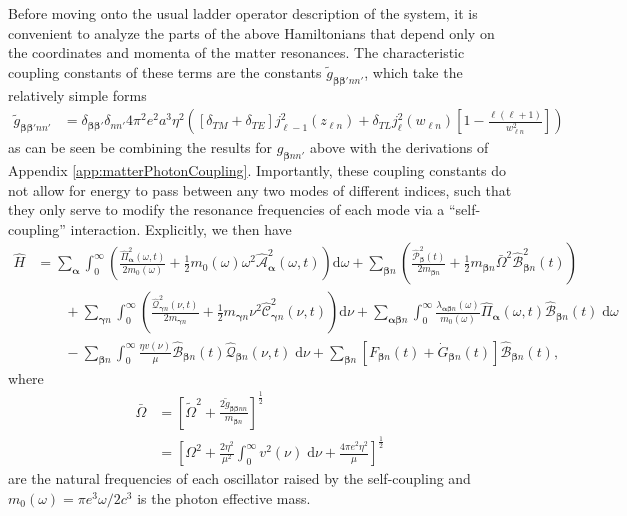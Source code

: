 \documentclass{article}
\begin{document}
Before moving onto the usual ladder operator description of the system, it is convenient to analyze the parts of the above Hamiltonians that depend only on the coordinates and momenta of the matter resonances. The characteristic coupling constants of these terms are the constants $\tilde{g}_{\bm{\beta}\bm{\beta}'nn'}$, which take the relatively simple forms 
\begin{equation}
\begin{split}
\tilde{g}_{\bm{\beta}\bm{\beta}'nn'} &= \delta_{\bm{\beta}\bm{\beta}'}\delta_{nn'}4\pi^2e^2a^3\eta^2\left([\delta_{TM} + \delta_{TE}]j_{\ell - 1}^2(z_{\ell n}) + \delta_{TL}j_\ell^2(w_{\ell n})\left[1 - \frac{\ell(\ell + 1)}{w_{\ell n}^2}\right]\right)
\end{split}
\end{equation}
as can be seen be combining the results for $g_{\bm{\beta}nn'}$ above with the derivations of Appendix \ref{app:matterPhotonCoupling}. Importantly, these coupling constants do not allow for energy to pass between any two modes of different indices, such that they only serve to modify the resonance frequencies of each mode via a ``self-coupling'' interaction. Explicitly, we then have
\begin{equation}
\begin{split}
\hat{H} &= \sum_{\bm{\alpha}}\int_0^\infty\left(\frac{\hat{\mathit{\Pi}}_{\bm{\alpha}}^2(\omega,t)}{2m_0(\omega)} + \frac{1}{2}m_0(\omega)\omega^2\hat{\mathcal{A}}_{\bm{\alpha}}^2(\omega,t)\right)\mathrm{d}\omega + \sum_{\bm{\beta}n}\left(\frac{\hat{\mathcal{P}}_{\bm{\beta}}^2(t)}{2m_{\bm{\beta}n}} + \frac{1}{2}m_{\bm{\beta}n}\bar{\Omega}^2\hat{\mathcal{B}}_{\bm{\beta}n}^2(t)\right)\\
&\qquad + \sum_{\bm{\gamma}n}\int_0^\infty\left(\frac{\hat{\mathcal{Q}}_{\bm{\gamma}n}^2(\nu,t)}{2m_{\bm{\gamma}n}} + \frac{1}{2}m_{\bm{\gamma}n}\nu^2\hat{\mathcal{C}}_{\bm{\gamma}n}^2(\nu,t)\right)\mathrm{d}\nu + \sum_{\bm{\alpha}\bm{\beta}n}\int_0^\infty\frac{\lambda_{\bm{\alpha}\bm{\beta}n}(\omega)}{m_0(\omega)}\hat{\mathit{\Pi}}_{\bm{\alpha}}(\omega,t)\hat{\mathcal{B}}_{\bm{\beta}n}(t)\;\mathrm{d}\omega\\
&\qquad  - \sum_{\bm{\beta}n}\int_0^\infty\frac{\eta v(\nu)}{\mu}\hat{\mathcal{B}}_{\bm{\beta}n}(t)\hat{\mathcal{Q}}_{\bm{\beta}n}(\nu,t)\;\mathrm{d}\nu + \sum_{\bm{\beta}n}\left[F_{\bm{\beta}n}(t) + \dot{G}_{\bm{\beta}n}(t)\right]\hat{\mathcal{B}}_{\bm{\beta}n}(t),
\end{split}
\end{equation}
where
\begin{equation}
\begin{split}
\bar{\Omega} &= \left[\tilde{\Omega}^2 + \frac{2\tilde{g}_{\bm{\beta}\bm{\beta}nn}}{m_{\bm{\beta}n}}\right]^\frac{1}{2}\\
&= \left[\Omega^2 + \frac{2\eta^2}{\mu^2}\int_0^\infty v^2(\nu)\;\mathrm{d}\nu + \frac{4\pi e^2\eta^2}{\mu}\right]^\frac{1}{2}
\end{split}
\end{equation}
are the natural frequencies of each oscillator raised by the self-coupling and $m_0(\omega) = \pi e^3\omega/2c^3$ is the photon effective mass.
\end{document}
